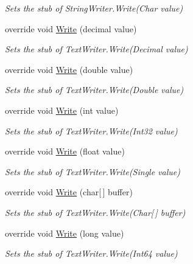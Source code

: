 \begin{DoxyCompactItemize}
\begin{DoxyCompactList}\small\item\em Sets the stub of String\-Writer.\-Write(\-Char value)\end{DoxyCompactList}\item 
override void \hyperlink{class_system_1_1_i_o_1_1_fakes_1_1_stub_string_writer_a84c63df79fd33f7c3a7e7cd35103593f}{Write} (decimal value)
\begin{DoxyCompactList}\small\item\em Sets the stub of Text\-Writer.\-Write(\-Decimal value)\end{DoxyCompactList}\item 
override void \hyperlink{class_system_1_1_i_o_1_1_fakes_1_1_stub_string_writer_a38e8bfbd43fc9eb8f2568f5a8005f9ad}{Write} (double value)
\begin{DoxyCompactList}\small\item\em Sets the stub of Text\-Writer.\-Write(\-Double value)\end{DoxyCompactList}\item 
override void \hyperlink{class_system_1_1_i_o_1_1_fakes_1_1_stub_string_writer_af09518eb3711bc87bdf3a244684e44a7}{Write} (int value)
\begin{DoxyCompactList}\small\item\em Sets the stub of Text\-Writer.\-Write(\-Int32 value)\end{DoxyCompactList}\item 
override void \hyperlink{class_system_1_1_i_o_1_1_fakes_1_1_stub_string_writer_a7dcab4cab40dfd5dfdbc439cac6131b3}{Write} (float value)
\begin{DoxyCompactList}\small\item\em Sets the stub of Text\-Writer.\-Write(\-Single value)\end{DoxyCompactList}\item 
override void \hyperlink{class_system_1_1_i_o_1_1_fakes_1_1_stub_string_writer_ae0090a3e33ad52b85d78a1f0ac3faf2a}{Write} (char\mbox{[}$\,$\mbox{]} buffer)
\begin{DoxyCompactList}\small\item\em Sets the stub of Text\-Writer.\-Write(\-Char\mbox{[}$\,$\mbox{]} buffer)\end{DoxyCompactList}\item 
override void \hyperlink{class_system_1_1_i_o_1_1_fakes_1_1_stub_string_writer_a290da5b64829506a6fdc2ddc78f3e533}{Write} (long value)
\begin{DoxyCompactList}\small\item\em Sets the stub of Text\-Writer.\-Write(\-Int64 value)\end{DoxyCompactList}\item 

\end{DoxyCompactItemize}
